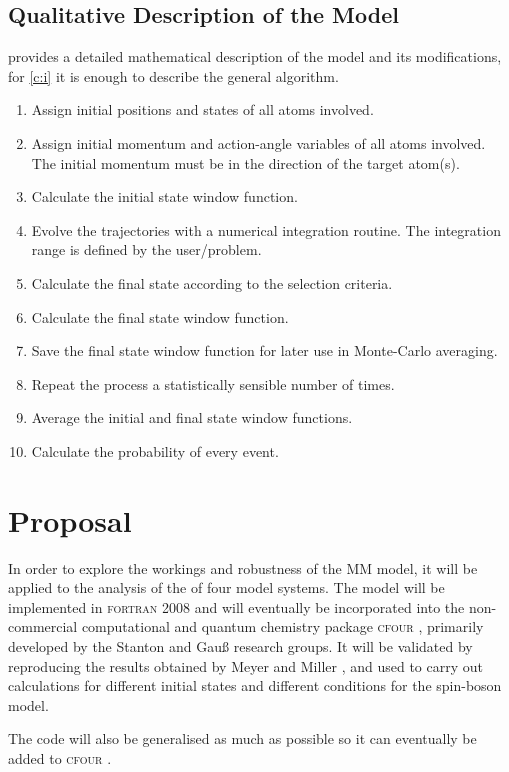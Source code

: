 \subsection{Qualitative Description of the Model}\label{sb:qdm}
%
 provides a detailed mathematical description of the model and its modifications, for \cref{c:i} it is enough to describe the general algorithm.
\begin{enumerate}
\item Assign initial positions and states of all atoms involved.
\item Assign initial momentum and action-angle variables of all atoms involved. The initial momentum must be in the direction of the target atom(s).
\item Calculate the initial state window function.
\item Evolve the trajectories with a numerical integration routine. The integration range is defined by the user/problem.
\item Calculate the final state according to the selection criteria.
\item Calculate the final state window function.
\item Save the final state window function for later use in Monte-Carlo averaging.
\item Repeat the process a statistically sensible number of times.
\item Average the initial and final state window functions.
\item Calculate the probability of every event.
\end{enumerate}
%
\section{Proposal}\label{s:p}
%
In order to explore the workings and robustness of the MM model, it will be applied to the analysis of the of four model systems. The model will be implemented in \textsc{fortran 2008} and will eventually be incorporated into the non-commercial computational and quantum chemistry package \textsc{cfour} \cite{cfour}, primarily developed by the Stanton and Gauß research groups. It will be validated by reproducing the results obtained by Meyer and Miller \cite{project}, and used to carry out calculations for different initial states and different conditions for the spin-boson model.

The code will also be generalised as much as possible so it can eventually be added to \textsc{cfour} \cite{cfour}.
%
